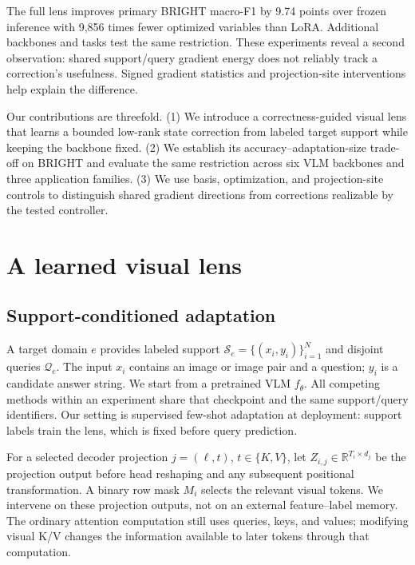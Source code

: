 \documentclass{article}
\newcommand{\R}{\mathbb{R}}
\newcommand{\Sset}{\mathcal{S}}
\newcommand{\Qset}{\mathcal{Q}}
\begin{document}
The full lens improves primary BRIGHT macro-F1 by 9.74 points over frozen inference with 9,856 times fewer optimized variables than LoRA. Additional backbones and tasks test the same restriction. These experiments reveal a second observation: shared support/query gradient energy does not reliably track a correction's usefulness. Signed gradient statistics and projection-site interventions help explain the difference.

Our contributions are threefold. (1) We introduce a correctness-guided visual lens that learns a bounded low-rank state correction from labeled target support while keeping the backbone fixed. (2) We establish its accuracy--adaptation-size trade-off on BRIGHT and evaluate the same restriction across six VLM backbones and three application families. (3) We use basis, optimization, and projection-site controls to distinguish shared gradient directions from corrections realizable by the tested controller.

\section{A learned visual lens}
\label{sec:method}
\subsection{Support-conditioned adaptation}
A target domain $e$ provides labeled support $\Sset_e=\{(x_i,y_i)\}_{i=1}^{N}$ and disjoint queries $\Qset_e$. The input $x_i$ contains an image or image pair and a question; $y_i$ is a candidate answer string. We start from a pretrained VLM $f_\theta$. All competing methods within an experiment share that checkpoint and the same support/query identifiers. Our setting is supervised few-shot adaptation at deployment: support labels train the lens, which is fixed before query prediction.

For a selected decoder projection $j=(\ell,t)$, $t\in\{K,V\}$, let $Z_{i,j}\in\R^{T_i\times d_j}$ be the projection output before head reshaping and any subsequent positional transformation. A binary row mask $M_i$ selects the relevant visual tokens. We intervene on these projection outputs, not on an external feature--label memory. The ordinary attention computation still uses queries, keys, and values; modifying visual K/V changes the information available to later tokens through that computation.
\end{document}
